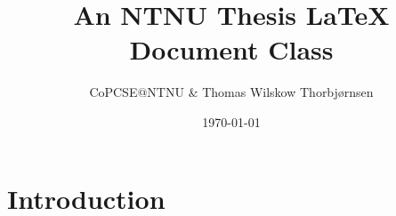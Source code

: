 \documentclass[british,titlepage]{ntnuthesis}
\title{An NTNU Thesis \LaTeX{} Document Class}
\author{CoPCSE$@$NTNU \& Thomas Wilskow Thorbjørnsen}
\date{\today}
\begin{document}
\tableofcontents

\printglossaries

\chapter{Introduction}
\end{document}
